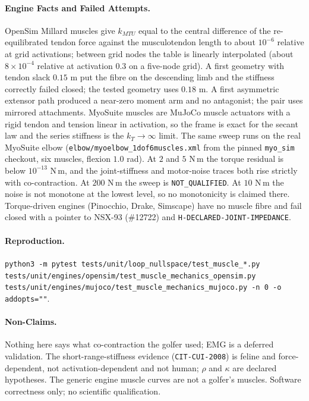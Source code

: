 \documentclass[11pt,a4paper]{article}
\begin{document}
\paragraph{Engine Facts and Failed Attempts.}  OpenSim Millard muscles give
$k_{MTU}$ equal to the central difference of the re-equilibrated tendon force
against the musculotendon length to about $10^{-6}$ relative at grid
activations; between grid nodes the table is linearly interpolated (about
$8\times10^{-4}$ relative at activation $0.3$ on a five-node grid).  A first
geometry with tendon slack $0.15$ m put the fibre on the descending limb and the
stiffness correctly failed closed; the tested geometry uses $0.18$ m.  A first
asymmetric extensor path produced a near-zero moment arm and no antagonist; the
pair uses mirrored attachments.  MyoSuite muscles are MuJoCo muscle actuators
with a rigid tendon and tension linear in activation, so the frame is exact for
the secant law and the series stiffness is the $k_T\to\infty$ limit.  The same
sweep runs on the real MyoSuite elbow (\texttt{elbow/myoelbow\_1dof6muscles.xml}
from the pinned \texttt{myo\_sim} checkout, six muscles, flexion $1.0$ rad).  At
$2$ and $5$ N\,m the torque residual is below $10^{-13}$ N\,m, and the
joint-stiffness and motor-noise traces both rise strictly with co-contraction.
At $200$ N\,m the sweep is \texttt{NOT\_QUALIFIED}.  At $10$ N\,m the noise is
not monotone at the lowest level, so no monotonicity is claimed there.
Torque-driven engines (Pinocchio, Drake, Simscape) have no muscle fibre and fail closed with a
pointer to NSX-93 (\#12722) and \texttt{H-DECLARED-JOINT-IMPEDANCE}.

\paragraph{Reproduction.}  \texttt{python3 -m pytest tests/unit/loop\_nullspace/test\_muscle\_*.py
tests/unit/engines/opensim/test\_muscle\_mechanics\_opensim.py
tests/unit/engines/mujoco/test\_muscle\_mechanics\_mujoco.py -n 0 -o addopts=""}.

\paragraph{Non-Claims.}  Nothing here says what co-contraction the golfer used;
EMG is a deferred validation.  The short-range-stiffness evidence
(\texttt{CIT-CUI-2008}) is feline and force-dependent, not activation-dependent
and not human; $\rho$ and $\kappa$ are declared hypotheses.  The generic engine
muscle curves are not a golfer's muscles.  Software correctness only; no
scientific qualification.
\end{document}
